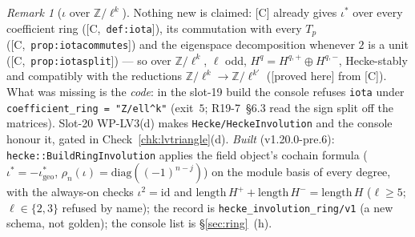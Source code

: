 \documentclass[11pt]{article}
\theoremstyle{remark}
\newtheorem{remark}[theorem]{Remark}
\newcommand{\Z}{\mathbb{Z}}
\newcommand{\HA}[1]{[C,~\texttt{#1}]}      %
\newcommand{\PROVED}{\textsf{[proved here]}}
\begin{document}
\begin{remark}[$\iota$ over $\Z/\ell^{k}$]\label{rmk:lviotak}
Nothing new is claimed: [C] already gives $\iota^{\ast}$ over every coefficient ring (\HA{def:iota}), its commutation with every $T_p$ (\HA{prop:iotacommutes}) and the eigenspace
decomposition whenever $2$ is a unit (\HA{prop:iotasplit}) --- so over $\Z/\ell^{k}$, $\ell$ odd, $H^{q}=H^{q,+}\oplus H^{q,-}$, Hecke-stably and compatibly with the reductions
$\Z/\ell^{k}\to\Z/\ell^{k'}$ (\PROVED{} from [C]). What was missing is the \emph{code}: in the slot-19 build the console refuses \texttt{iota} under
\texttt{coefficient\_ring = "Z/ell\^{}k"} (exit~$5$; R19-7~\S6.3 read the sign split off the matrices). Slot-20 WP-LV3(d) makes \texttt{Hecke/HeckeInvolution} and the console honour it,
gated in Check~\ref{chk:lvtriangle}(d). \emph{Built} (v1.20.0-pre.6): \texttt{hecke::BuildRingInvolution} applies the field object's cochain formula ($\iota^{\ast}=-\iota^{\ast}_{\mathrm{geo}}$,
$\rho_n(\iota)=\mathrm{diag}((-1)^{n-j})$) on the module basis of every degree, with the always-on checks $\iota^{2}=\mathrm{id}$ and $\mathrm{length}\,H^{+}+\mathrm{length}\,H^{-}=\mathrm{length}\,H$
($\ell\ge5$; $\ell\in\{2,3\}$ refused by name); the record is \texttt{hecke\_involution\_ring/v1} (a new schema, not golden); the console list is \S\ref{sec:ring}~(h).
\end{remark}
\end{document}
